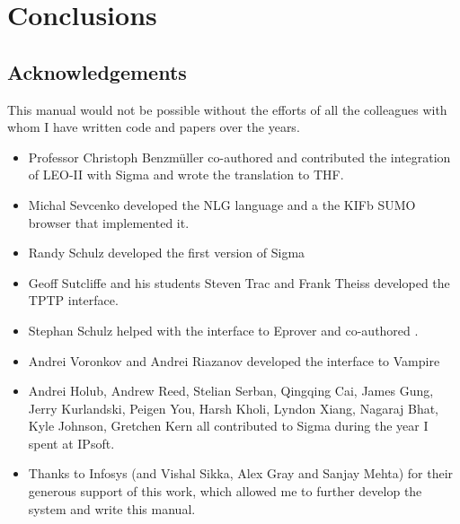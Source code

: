 \documentclass{book}
\begin{document}

\chapter{Conclusions}

\section{Acknowledgements}

This manual would not be possible without the efforts of all the colleagues with
whom I have written code and papers over the years.

\begin{itemize}

\item Professor Christoph Benzmüller co-authored \cite{pb10} and contributed
the integration of LEO-II with Sigma and wrote the translation to THF.

\item Michal Sevcenko developed the NLG language and a the KIFb SUMO browser that
implemented it.

\item Randy Schulz developed the first version of Sigma

\item Geoff Sutcliffe and his students Steven Trac and Frank Theiss developed the TPTP
interface.

\item Stephan Schulz helped with the interface to Eprover and co-authored \cite{ps14}.

\item Andrei Voronkov and Andrei Riazanov developed the interface to Vampire

\item Andrei Holub, Andrew Reed, Stelian Serban, Qingqing Cai, James Gung, Jerry
Kurlandski, Peigen You, Harsh Kholi, Lyndon Xiang, Nagaraj Bhat, Kyle Johnson,
Gretchen Kern all contributed to Sigma during the year I spent at IPsoft.

\item Thanks to Infosys (and Vishal Sikka, Alex Gray and Sanjay Mehta) for their
generous support of this work, which allowed me to further develop the system
and write this manual.

\end{itemize}






\newpage
\label{classindex}
\printindex[classes] %
\printindex
\end{document}
